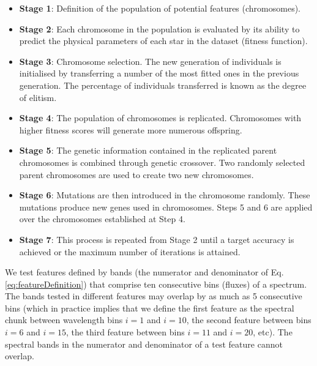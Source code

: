\begin{itemize}
\item \textbf{Stage 1}:{ Definition of the population of
potential features (chromosomes).}

\item \textbf{Stage 2}:{ Each chromosome in the population
is evaluated by its ability to predict the physical parameters of each
star in the dataset (fitness function). }

\item \textbf{Stage 3}:{ Chromosome selection. The new
generation of individuals is initialised by transferring a number of
the most fitted ones in the previous generation. The percentage of
individuals transferred is known as the degree of elitism. }

\item \textbf{Stage 4}:{ The population of chromosomes is replicated. 
 Chromosomes with higher fitness scores will generate more numerous
 offspring.}

\item \textbf{Stage 5}:{ The genetic information contained in
the replicated parent chromosomes is combined through genetic
crossover. Two randomly selected parent chromosomes are used to create
two new chromosomes.}

\item \textbf{Stage 6}:{ Mutations are then introduced in the
chromosome randomly. These mutations produce new genes used in
chromosomes.  Steps 5 and 6 are applied over the chromosomes
established at Step 4.}

\item \textbf{Stage 7}:{ This process is repeated from Stage 2 until 
a target accuracy is achieved or the maximum number of iterations is
attained.}

\end{itemize}

We test features defined by bands (the numerator and denominator of
Eq. \ref{eq:featureDefinition}) that comprise ten consecutive bins
(fluxes) of a spectrum. The bands tested in different features may
overlap by as much as 5 consecutive bins (which in practice implies
that we define the first feature as the spectral chunk between
wavelength bins $i=1$ and $i=10$, the second feature between bins
$i=6$ and $i=15$, the third feature between bins $i=11$ and $i=20$,
etc). The spectral bands in the numerator and denominator of a test
feature cannot overlap.

